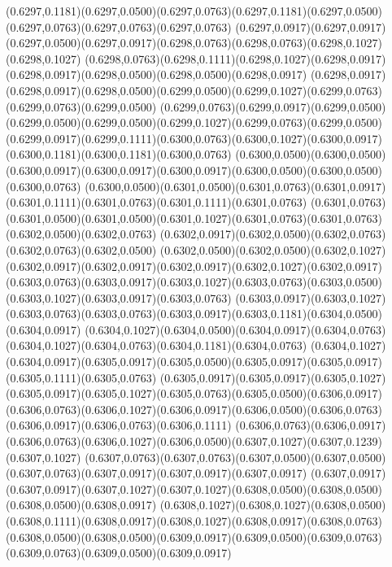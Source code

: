 (0.6297,0.1181)(0.6297,0.0500)(0.6297,0.0763)(0.6297,0.1181)(0.6297,0.0500)(0.6297,0.0763)(0.6297,0.0763)(0.6297,0.0763)
(0.6297,0.0917)(0.6297,0.0917)(0.6297,0.0500)(0.6297,0.0917)(0.6298,0.0763)(0.6298,0.0763)(0.6298,0.1027)(0.6298,0.1027)
(0.6298,0.0763)(0.6298,0.1111)(0.6298,0.1027)(0.6298,0.0917)(0.6298,0.0917)(0.6298,0.0500)(0.6298,0.0500)(0.6298,0.0917)
(0.6298,0.0917)(0.6298,0.0917)(0.6298,0.0500)(0.6299,0.0500)(0.6299,0.1027)(0.6299,0.0763)(0.6299,0.0763)(0.6299,0.0500)
(0.6299,0.0763)(0.6299,0.0917)(0.6299,0.0500)(0.6299,0.0500)(0.6299,0.0500)(0.6299,0.1027)(0.6299,0.0763)(0.6299,0.0500)
(0.6299,0.0917)(0.6299,0.1111)(0.6300,0.0763)(0.6300,0.1027)(0.6300,0.0917)(0.6300,0.1181)(0.6300,0.1181)(0.6300,0.0763)
(0.6300,0.0500)(0.6300,0.0500)(0.6300,0.0917)(0.6300,0.0917)(0.6300,0.0917)(0.6300,0.0500)(0.6300,0.0500)(0.6300,0.0763)
(0.6300,0.0500)(0.6301,0.0500)(0.6301,0.0763)(0.6301,0.0917)(0.6301,0.1111)(0.6301,0.0763)(0.6301,0.1111)(0.6301,0.0763)
(0.6301,0.0763)(0.6301,0.0500)(0.6301,0.0500)(0.6301,0.1027)(0.6301,0.0763)(0.6301,0.0763)(0.6302,0.0500)(0.6302,0.0763)
(0.6302,0.0917)(0.6302,0.0500)(0.6302,0.0763)(0.6302,0.0763)(0.6302,0.0500)
\PST@Solid(0.6302,0.0500)(0.6302,0.0500)(0.6302,0.1027)(0.6302,0.0917)(0.6302,0.0917)(0.6302,0.0917)(0.6302,0.1027)(0.6302,0.0917)
(0.6303,0.0763)(0.6303,0.0917)(0.6303,0.1027)(0.6303,0.0763)(0.6303,0.0500)(0.6303,0.1027)(0.6303,0.0917)(0.6303,0.0763)
(0.6303,0.0917)(0.6303,0.1027)(0.6303,0.0763)(0.6303,0.0763)(0.6303,0.0917)(0.6303,0.1181)(0.6304,0.0500)(0.6304,0.0917)
(0.6304,0.1027)(0.6304,0.0500)(0.6304,0.0917)(0.6304,0.0763)(0.6304,0.1027)(0.6304,0.0763)(0.6304,0.1181)(0.6304,0.0763)
(0.6304,0.1027)(0.6304,0.0917)(0.6305,0.0917)(0.6305,0.0500)(0.6305,0.0917)(0.6305,0.0917)(0.6305,0.1111)(0.6305,0.0763)
(0.6305,0.0917)(0.6305,0.0917)(0.6305,0.1027)(0.6305,0.0917)(0.6305,0.1027)(0.6305,0.0763)(0.6305,0.0500)(0.6306,0.0917)
(0.6306,0.0763)(0.6306,0.1027)(0.6306,0.0917)(0.6306,0.0500)(0.6306,0.0763)(0.6306,0.0917)(0.6306,0.0763)(0.6306,0.1111)
(0.6306,0.0763)(0.6306,0.0917)(0.6306,0.0763)(0.6306,0.1027)(0.6306,0.0500)(0.6307,0.1027)(0.6307,0.1239)(0.6307,0.1027)
(0.6307,0.0763)(0.6307,0.0763)(0.6307,0.0500)(0.6307,0.0500)(0.6307,0.0763)(0.6307,0.0917)(0.6307,0.0917)(0.6307,0.0917)
(0.6307,0.0917)(0.6307,0.0917)(0.6307,0.1027)(0.6307,0.1027)(0.6308,0.0500)(0.6308,0.0500)(0.6308,0.0500)(0.6308,0.0917)
(0.6308,0.1027)(0.6308,0.1027)(0.6308,0.0500)(0.6308,0.1111)(0.6308,0.0917)(0.6308,0.1027)(0.6308,0.0917)(0.6308,0.0763)
(0.6308,0.0500)(0.6308,0.0500)(0.6309,0.0917)(0.6309,0.0500)(0.6309,0.0763)(0.6309,0.0763)(0.6309,0.0500)(0.6309,0.0917)

